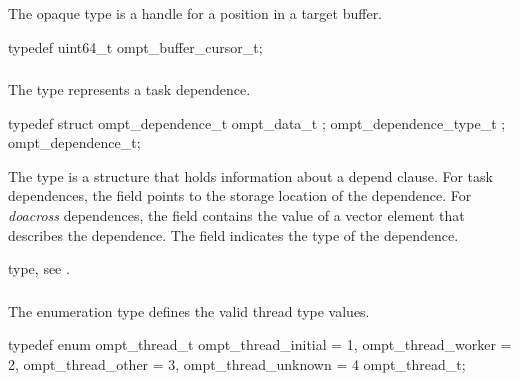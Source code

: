 \summary
The  opaque type is a handle for a position 
in a target buffer.

\format
\begin{ccppspecific}
\begin{omptOther}
typedef uint64_t ompt_buffer_cursor_t;
\end{omptOther}
\end{ccppspecific}



\subsubsection{}
\label{sec:ompt_dependence_t}

\summary
The  type represents a task dependence.

\format
\begin{ccppspecific}
\begin{omptOther}
typedef struct ompt_dependence_t {
  ompt_data_t ;
  ompt_dependence_type_t ;
} ompt_dependence_t;
\end{omptOther}
\end{ccppspecific}

\descr
The  type is a structure that holds information about 
a depend clause. For task dependences, the  field points to the 
storage location of the dependence. For \emph{doacross} dependences, the 
 field contains the value of a vector element that describes
the dependence. The  field indicates the type of the dependence.

\begin{crossrefs}
\item {} type, see
.
\end{crossrefs}



\subsubsection{}
\label{sec:ompt_thread_t}

\summary
The  enumeration type defines the valid thread type values.

\format
\begin{ccppspecific}
\begin{omptEnum}
typedef enum ompt_thread_t {
  ompt_thread_initial                 = 1,
  ompt_thread_worker                  = 2,
  ompt_thread_other                   = 3,
  ompt_thread_unknown                 = 4
} ompt_thread_t;
\end{omptEnum}
\end{ccppspecific}

